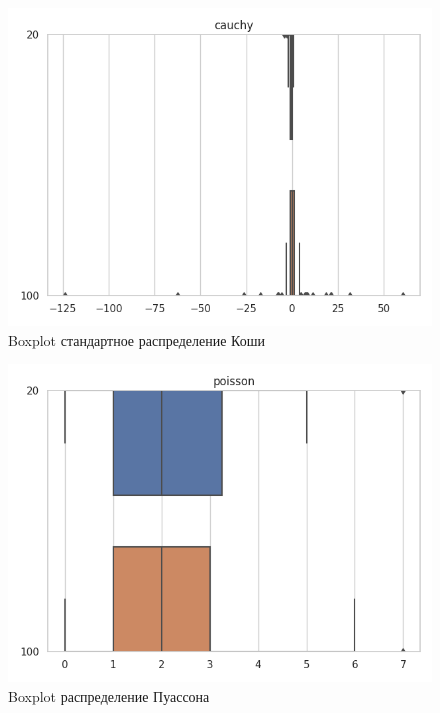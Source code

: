\documentclass[12pt]{report}
\begin{document}
\begin{center}
\begin{figure}[H]
\caption{Boxplot стандартное распределение Коши }
\includegraphics[scale = 0.7]{../lab_3/pic/cauchy.png} 
\end{figure}

\begin{figure}[H]
\caption{Boxplot распределение Пуассона }
\includegraphics[scale = 0.7]{../lab_3/pic/poisson.png} 
\end{figure}


\end{center}
\end{document}
